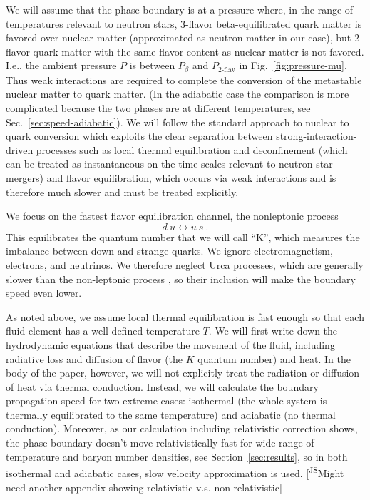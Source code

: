\documentclass[10pt,superscriptaddress,
amsmath,aps,prc,twocolumn,nofootinbib,floatfix]{revtex4-1}
\newcommand{\mga}[1]{{\color[rgb]{0.6,0,0}#1}}
\newcommand{\JS}[1]{{\color{violet}#1}}
\newcommand{\JScom}[1]{\textsf{\color{violet} [\textsuperscript{JS}#1]}}
\newcommand{\be}{\beta}
\begin{document}
\mga{We will assume that the phase boundary is at a pressure where, in the range of temperatures relevant to neutron stars, 3-flavor beta-equilibrated quark matter is favored over nuclear matter (approximated as neutron matter in our case), but 2-flavor quark matter with the same flavor content as nuclear matter is not favored. I.e., the ambient pressure $P$ is between $P_\be$ and $P_{\text{2-flav}}$ in Fig.~\ref{fig:pressure-mu}. Thus weak interactions are required to complete the conversion of the metastable nuclear matter to quark matter. (In the adiabatic case the comparison is more complicated because the two phases are at different temperatures, see Sec.~\ref{sec:speed-adiabatic}).}
We will follow the standard approach to nuclear to quark conversion \cite{Olinto:1986je,Bombaci:2000cv,Bhattacharyya:2006vy,Niebergal:2010ds,Furusawa:2015vfn,Rosero-Gil:2020caj}
which exploits the clear separation between strong-interaction-driven processes such as local thermal equilibration and deconfinement (which can be treated as instantaneous on the time scales relevant to neutron star mergers) and flavor equilibration, which occurs via weak interactions and is therefore much slower and must be treated explicitly. 

We focus on the fastest flavor equilibration channel, the nonleptonic process
\begin{equation}
    d\ u \leftrightarrow u\ s\ .
\label{eq:nonleptonic}
\end{equation}
This equilibrates the quantum number that we will call ``K'', which measures the imbalance between down and strange quarks. 
We ignore electromagnetism, electrons, and neutrinos. We therefore neglect Urca processes, which are generally slower than the non-leptonic process \cite{Alford:2006gy,Alford:2025tbp,Sad:2007afd}, so their inclusion will make the boundary speed even lower.

As noted above, we assume local thermal equilibration is fast enough so that each fluid element has a well-defined temperature $T$. 
\mga{We will first write down the hydrodynamic equations that describe the movement of the fluid, including radiative loss and diffusion of flavor (the $K$ quantum number) and heat.
In the body of the paper, however, we will
not explicitly treat the radiation or diffusion of heat via thermal conduction. Instead, we will calculate the boundary
propagation speed for two extreme cases: isothermal (the whole system is thermally equilibrated to the same temperature) and adiabatic (no thermal conduction).
}
\JS{Moreover, as our calculation including relativistic correction shows, the phase boundary doesn't move relativistically fast for wide range of temperature and baryon number densities, see Section~\ref{sec:results}, so in both isothermal and adiabatic cases, slow velocity approximation is used. }\JScom{Might need another appendix showing relativistic v.s. non-relativistic}
\end{document}
